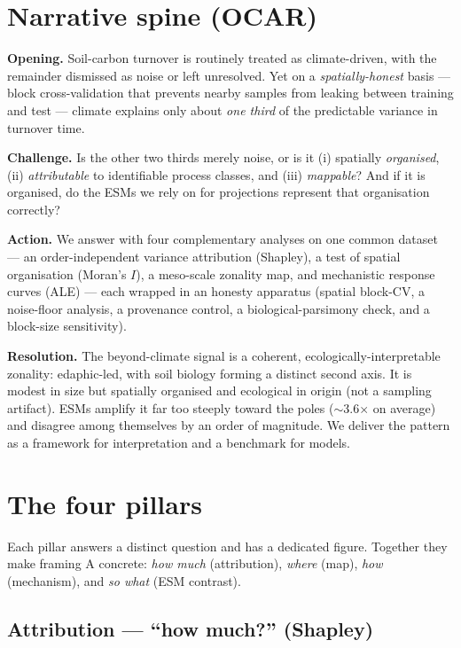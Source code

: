 \documentclass[11pt]{article}
\begin{document}
\section{Narrative spine (OCAR)}

\textbf{Opening.} Soil-carbon turnover is routinely treated as climate-driven,
with the remainder dismissed as noise or left unresolved. Yet on a
\emph{spatially-honest} basis --- block cross-validation that prevents nearby
samples from leaking between training and test --- climate explains only about
\emph{one third} of the predictable variance in turnover time.

\textbf{Challenge.} Is the other two thirds merely noise, or is it (i)
spatially \emph{organised}, (ii) \emph{attributable} to identifiable process
classes, and (iii) \emph{mappable}? And if it is organised, do the ESMs we rely
on for projections represent that organisation correctly?

\textbf{Action.} We answer with four complementary analyses on one common
dataset --- an order-independent variance attribution (Shapley), a test of
spatial organisation (Moran's $I$), a meso-scale zonality map, and mechanistic
response curves (ALE) --- each wrapped in an honesty apparatus (spatial
block-CV, a noise-floor analysis, a provenance control, a biological-parsimony
check, and a block-size sensitivity).

\textbf{Resolution.} The beyond-climate signal is a coherent,
ecologically-interpretable zonality: edaphic-led, with soil biology forming a
distinct second axis. It is modest in size but spatially organised and
ecological in origin (not a sampling artifact). ESMs amplify it far too steeply
toward the poles ($\sim$3.6$\times$ on average) and disagree among themselves by
an order of magnitude. We deliver the pattern as a framework for interpretation
and a benchmark for models.

\section{The four pillars}

Each pillar answers a distinct question and has a dedicated figure. Together they
make framing A concrete: \emph{how much} (attribution), \emph{where} (map),
\emph{how} (mechanism), and \emph{so what} (ESM contrast).

\subsection{Attribution --- ``how much?'' (Shapley)}
\end{document}
